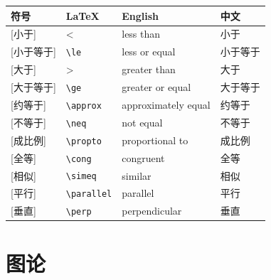\documentclass[11pt]{ctexart}
\begin{document}
\begin{longtable}{>{\centering\arraybackslash}m{2cm} m{3.5cm} m{4.5cm} m{4cm}}
\toprule
符号 & LaTeX & English & 中文 \\
\midrule
\syms{$<$}{<}[小于] & < & less than & 小于 \\
\syms{$\le$}{\verb|\le|}[小于等于] & \verb|\le| & less or equal & 小于等于 \\
\syms{$>$}{>}[大于] & > & greater than & 大于 \\
\syms{$\ge$}{\verb|\ge|}[大于等于] & \verb|\ge| & greater or equal & 大于等于 \\
\syms{$\approx$}{\verb|\approx|}[约等于] & \verb|\approx| & approximately equal & 约等于 \\
\syms{$\neq$}{\verb|\neq|}[不等于] & \verb|\neq| & not equal & 不等于 \\
\syms{$\propto$}{\verb|\propto|}[成比例] & \verb|\propto| & proportional to & 成比例 \\
\syms{$\cong$}{\verb|\cong|}[全等] & \verb|\cong| & congruent & 全等 \\
\syms{$\simeq$}{\verb|\simeq|}[相似] & \verb|\simeq| & similar & 相似 \\
\syms{$\parallel$}{\verb|\parallel|}[平行] & \verb|\parallel| & parallel & 平行 \\
\syms{$\perp$}{\verb|\perp|}[垂直] & \verb|\perp| & perpendicular & 垂直 \\
\bottomrule
\end{longtable}

\section{图论}\label{sec:graphs}
\end{document}
